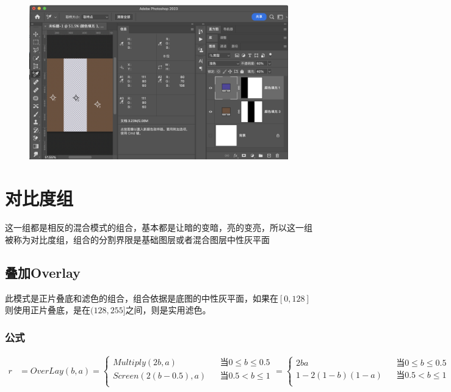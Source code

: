 \begin{figure}[h!]
	\centering
	\includegraphics[width=\linewidth]{figure/lighter}
	\caption{}
	\label{fig:lighter}
\end{figure}
%
%



\chapter{对比度组}
\begin{introduction}
   \item 这一组都是相反的混合模式的组合，基本都是让暗的变暗，亮的变亮，所以这一组被称为对比度组，组合的分割界限是基础图层或者混合图层中性灰平面
\end{introduction}
\section{ 叠加Overlay}

此模式是正片叠底和滤色的组合，组合依据是底图的中性灰平面，如果在$[0,128]$则使用正片叠底，是在$(128,255]$之间，则是实用滤色。

\subsection{ 公式}

\begin{equation}
	\begin{aligned}r&=OverLay(b,a)=\left\{\begin{aligned}Multiply(2b,a)&&当 0\leq b \leq 0.5\\Screen(2(b-0.5),a)&&当 0.5< b \leq 1\\\end{aligned}\right.=\left\{\begin{aligned}2ba&&当 0\leq b \leq 0.5\\1-2(1-b)(1-a)&&当 0.5< b \leq 1\\\end{aligned}\right.\end{aligned}
\end{equation}

